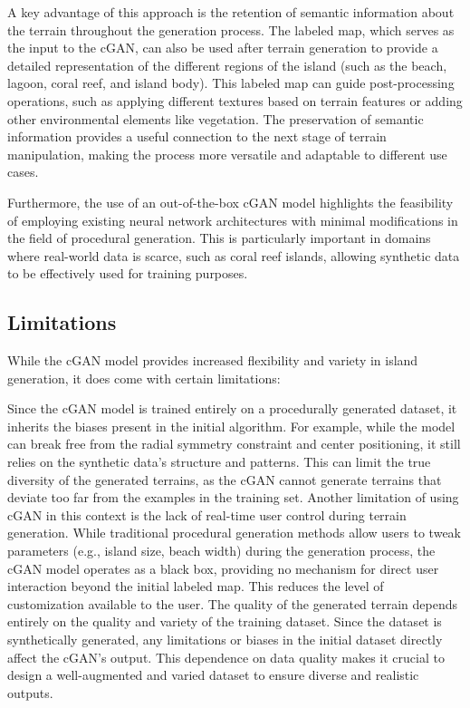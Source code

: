 A key advantage of this approach is the retention of semantic information about the terrain throughout the generation process. The labeled map, which serves as the input to the cGAN, can also be used after terrain generation to provide a detailed representation of the different regions of the island (such as the beach, lagoon, coral reef, and island body). This labeled map can guide post-processing operations, such as applying different textures based on terrain features or adding other environmental elements like vegetation. The preservation of semantic information provides a useful connection to the next stage of terrain manipulation, making the process more versatile and adaptable to different use cases.

Furthermore, the use of an out-of-the-box cGAN model highlights the feasibility of employing existing neural network architectures with minimal modifications in the field of procedural generation. This is particularly important in domains where real-world data is scarce, such as coral reef islands, allowing synthetic data to be effectively used for training purposes.


\subsection{Limitations}

While the cGAN model provides increased flexibility and variety in island generation, it does come with certain limitations:

\begin{Itemize}
     Since the cGAN model is trained entirely on a procedurally generated dataset, it inherits the biases present in the initial algorithm. For example, while the model can break free from the radial symmetry constraint and center positioning, it still relies on the synthetic data's structure and patterns. This can limit the true diversity of the generated terrains, as the cGAN cannot generate terrains that deviate too far from the examples in the training set.
     Another limitation of using cGAN in this context is the lack of real-time user control during terrain generation. While traditional procedural generation methods allow users to tweak parameters (e.g., island size, beach width) during the generation process, the cGAN model operates as a black box, providing no mechanism for direct user interaction beyond the initial labeled map. This reduces the level of customization available to the user.
     The quality of the generated terrain depends entirely on the quality and variety of the training dataset. Since the dataset is synthetically generated, any limitations or biases in the initial dataset directly affect the cGAN's output. This dependence on data quality makes it crucial to design a well-augmented and varied dataset to ensure diverse and realistic outputs.
\end{Itemize}


